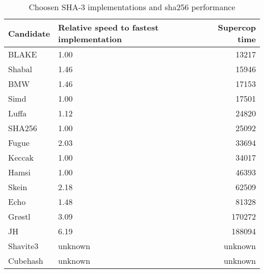\begin{table}
  \centering
  \begin{tabular}{ | l | l | r | }
    \hline
    \textbf{Candidate} & \textbf{Relative speed to fastest implementation} &
    \textbf{Supercop time} \\ \hline
     BLAKE      & 1.00              & 13217         \\ \hline
     Shabal     & 1.46              & 15946         \\ \hline
     \ac{BMW}   & 1.46              & 17153         \\ \hline
     Simd       & 1.00              & 17501         \\ \hline
     Luffa      & 1.12              & 24820         \\ \hline
     SHA256     & 1.00              & 25092         \\ \hline
     Fugue      & 2.03              & 33694         \\ \hline
     Keccak     & 1.00              & 34017         \\ \hline
     Hamsi      & 1.00              & 46393         \\ \hline
     Skein      & 2.18              & 62509         \\ \hline
     Echo       & 1.48              & 81328         \\ \hline
     Grøstl    & 3.09              & 170272        \\ \hline
     JH         & 6.19              & 188094        \\ \hline
     Shavite3   & unknown           & unknown       \\ \hline
     Cubehash   & unknown           & unknown       \\ \hline
  \end{tabular}
  \caption{Choosen \ac{SHA}-3 implementations and sha256 performance}
  \label{tbl:sha3:speedrelative}
\end{table}
